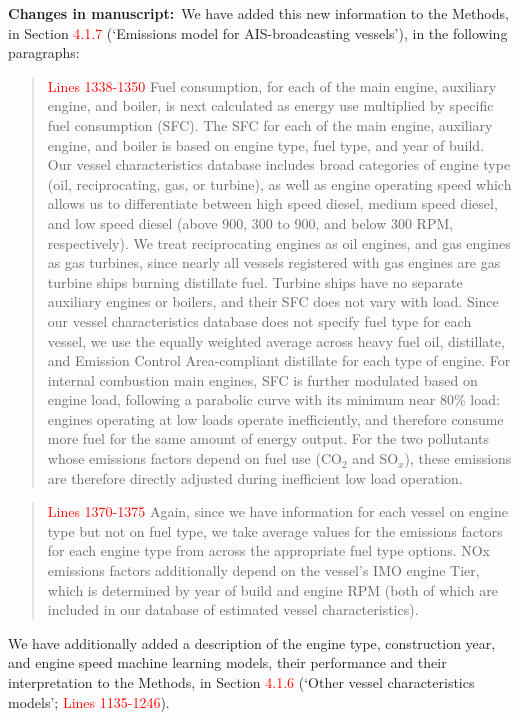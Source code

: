 \documentclass[11pt]{article}
\newcommand{\changes}{\par\medskip\noindent%
  \textbf{\textcolor{changegreen}{Changes in manuscript:}}\ }
\begin{document}
\changes We have added this new information to the Methods, in Section \textcolor{red}{4.1.7} (`Emissions model for AIS-broadcasting vessels'), in the following paragraphs:

\begin{quote}
\textcolor{red}{Lines 1338-1350}  Fuel consumption, for each of the main engine, auxiliary engine, and boiler, is next calculated as energy use multiplied by specific fuel consumption (SFC). The SFC for each of the main engine, auxiliary engine, and boiler is based on engine type, fuel type, and year of build. Our vessel characteristics database includes broad categories of engine type (oil, reciprocating, gas, or turbine), as well as engine operating speed which allows us to differentiate between high speed diesel, medium speed diesel, and low speed diesel (above 900, 300 to 900, and below 300 RPM, respectively). We treat reciprocating engines as oil engines, and gas engines as gas turbines, since nearly all vessels registered with gas engines are gas turbine ships burning distillate fuel. Turbine ships have no separate auxiliary engines or boilers, and their SFC does not vary with load. Since our vessel characteristics database does not specify fuel type for each vessel, we use the equally weighted average across heavy fuel oil, distillate, and Emission Control Area-compliant distillate for each type of engine. For internal combustion main engines, SFC is further modulated based on engine load, following a parabolic curve with its minimum near 80\% load: engines operating at low loads operate inefficiently, and therefore consume more fuel for the same amount of energy output. For the two pollutants whose emissions factors depend on fuel use (CO$_{2}$ and SO$_{x}$), these emissions are therefore directly adjusted during inefficient low load operation.
\end{quote}

\begin{quote}
 \textcolor{red}{Lines 1370-1375} Again, since we have information for each vessel on engine type but not on fuel type, we take average values for the emissions factors for each engine type from across the appropriate fuel type options. NOx emissions factors additionally depend on the vessel’s IMO engine Tier, which is determined by year of build and engine RPM (both of which are included in our database of estimated vessel characteristics).
 \end{quote}

We have additionally added a description of the engine type, construction year, and engine speed machine learning models, their performance and their interpretation to the Methods, in Section \textcolor{red}{4.1.6} (`Other vessel characteristics models'; \textcolor{red}{Lines 1135-1246}). 
\end{document}
